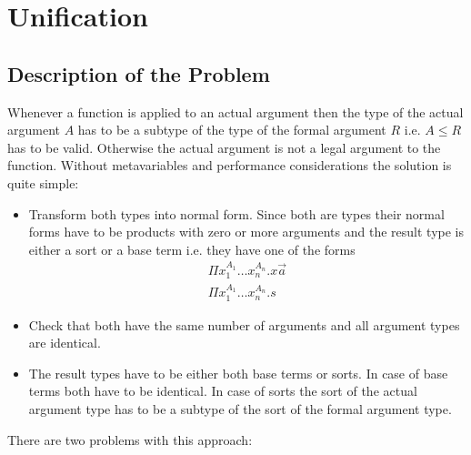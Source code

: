 \section{Unification}






\subsection{Description of the Problem}

Whenever a function is applied to an actual argument then the type of the actual
argument $A$ has to be a subtype of the type of the formal argument $R$ i.e. $A
\le R$ has to be valid. Otherwise the actual argument is not a legal argument to
the function. Without metavariables and performance considerations the solution
is quite simple:

\begin{itemize}

    \item Transform both types into normal form. Since both are types their normal
        forms have to be products with zero or more arguments and the result type is
        either a sort or a base term i.e. they have one of the forms
        $$
        \begin{array}{l}
            \Pi x_1^{A_1} \ldots x_n^{A_n}. x \vec a
            \\
            \Pi x_1^{A_1} \ldots x_n^{A_n}. s
        \end{array}
        $$

    \item Check that both have the same number of arguments and  all argument types
        are identical.

    \item The result types have to be either both base terms or sorts. In case of
        base terms both have to be identical. In case of sorts the sort of the actual
        argument type has to be a subtype of the sort of the formal argument type.

\end{itemize}


There are two problems with this approach:

